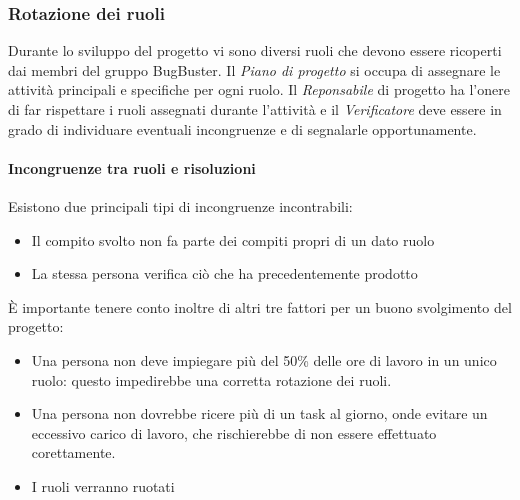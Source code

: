 \subsubsection{Rotazione dei ruoli}

Durante lo sviluppo del progetto vi sono diversi ruoli che devono essere ricoperti dai membri del gruppo BugBuster. Il \textit{Piano di progetto} si occupa di assegnare le attività principali e specifiche per ogni ruolo. Il \textit{Reponsabile} di progetto ha l'onere di far rispettare i ruoli assegnati durante l'attività e il \textit{Verificatore} deve essere in grado di individuare eventuali incongruenze e di segnalarle opportunamente.
\paragraph*{Incongruenze tra ruoli e risoluzioni}
Esistono due principali tipi di incongruenze incontrabili:
\begin{itemize}

\item Il compito svolto non fa parte dei compiti propri di un dato ruolo
\item La stessa persona verifica ciò che ha precedentemente prodotto
\end{itemize}

È importante tenere conto inoltre di altri tre fattori per un buono svolgimento del progetto:
\begin{itemize}

\item Una persona non deve impiegare più del 50\% delle ore di lavoro in un unico ruolo: questo impedirebbe una corretta rotazione dei ruoli.
\item Una persona non dovrebbe ricere più di un task al giorno, onde evitare un eccessivo carico di lavoro, che rischierebbe di non essere effettuato corettamente.
\item I ruoli verranno ruotati %

\end{itemize}
